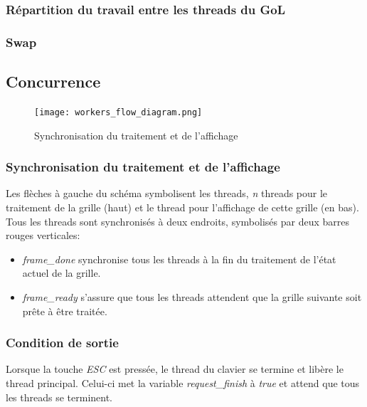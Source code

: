 \documentclass[11pt, a4paper]{article}
\begin{document}
\subsubsection{Répartition du travail entre les threads du GoL}

\subsubsection{Swap}

\newpage

\subsection{Concurrence}

\begin{figure}[H]
	\begin{center}
		\texttt{[image: workers\_flow\_diagram.png]}
	\end{center}
	\caption{Synchronisation du traitement et de l'affichage}
	\label{Synchronisation du traitement et de l'affichage}
\end{figure}

\subsubsection{Synchronisation du traitement et de l'affichage}

Les flèches à gauche du schéma symbolisent les threads, \textit{n} threads pour le traitement de la grille (haut) et le thread pour l'affichage de cette grille (en bas). \\

Tous les threads sont synchronisés à deux endroits, symbolisés par deux barres rouges verticales:
\begin{itemize}
	\item \textit{frame\_done} synchronise tous les threads à la fin du traitement de l'état actuel de la grille.
	\item \textit{frame\_ready} s'assure que tous les threads attendent que la grille suivante soit prête à être traitée.
\end{itemize}

\subsubsection{Condition de sortie}

Lorsque la touche \textit{ESC} est pressée, le thread du clavier se termine et libère le thread principal. Celui-ci met la variable \textit{request\_finish} à \textit{true} et attend que tous les threads se terminent. \\
\end{document}
